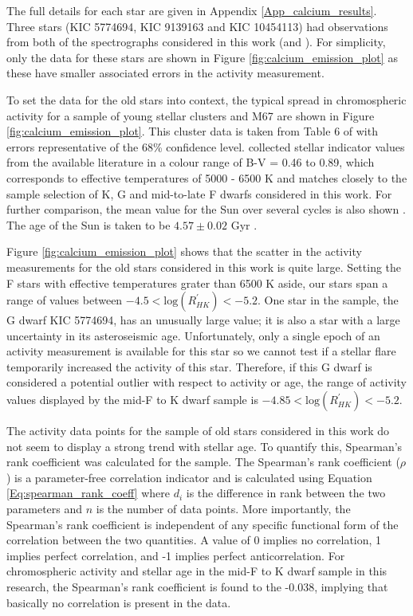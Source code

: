The full details for each star are given in Appendix \ref{App_calcium_results}. Three stars (KIC 5774694, KIC 9139163 and KIC 10454113) had observations from both of the spectrographs considered in this work (\esp and \narval). For simplicity, only the \narval data for these stars are shown in Figure \ref{fig:calcium_emission_plot} as these have smaller associated errors in the activity measurement. 

To set the data for the old stars into context, the typical spread in chromospheric activity for a sample of young stellar clusters and M67 are shown in Figure \ref{fig:calcium_emission_plot}. This cluster data is taken from Table 6 of \citet{Mamajek_Hillenbrand_2008} with errors representative of the 68\% confidence level. \citet{Mamajek_Hillenbrand_2008} collected stellar \Rprime indicator values from the available literature in a colour range of B-V = 0.46 to 0.89, which corresponds to effective temperatures of 5000 - 6500 K and matches closely to the sample selection of K, G and mid-to-late F dwarfs considered in this work. For further comparison, the mean \Rprime value for the Sun over several cycles is also shown \citep{Egeland_etal_2017}. The age of the Sun is taken to be $4.57 \pm 0.02$ Gyr \citep{Bahcall_etal_1995}.

Figure \ref{fig:calcium_emission_plot} shows that the scatter in the \Rprime activity measurements for the old stars considered in this work is quite large. Setting the F stars with effective temperatures grater than 6500 K aside, our stars span a range of \Rprime values between $-4.5<\mathrm{log}(R^{'}_{HK})<-5.2$. One star in the sample, the G dwarf KIC 5774694, has an unusually large \Rprime value; it is also a star with a large uncertainty in its asteroseismic age. Unfortunately, only a single epoch of an activity measurement is available for this star so we cannot test if a stellar flare temporarily increased the activity of this star. Therefore, if this G dwarf is considered a potential outlier with respect to activity or age, the range of activity values displayed by the mid-F to K dwarf sample is $-4.85<\mathrm{log}(R^{'}_{HK})<-5.2$.

The activity data points for the sample of old stars considered in this work do not seem to display a strong trend with stellar age. To quantify this, Spearman's rank coefficient was calculated for the sample. The Spearman's rank coefficient ($\rho$) is a parameter-free correlation indicator and is calculated using Equation \ref{Eq:spearman_rank_coeff} where $d_{i}$ is the difference in rank between the two parameters and $n$ is the number of data points. More importantly, the Spearman's rank coefficient is independent of any specific functional form of the correlation between the two quantities. A value of 0 implies no correlation, 1 implies perfect correlation, and -1 implies perfect anticorrelation. For chromospheric activity and stellar age in the mid-F to K dwarf sample in this research, the Spearman's rank coefficient is found to the -0.038, implying that basically no correlation is present in the data.

